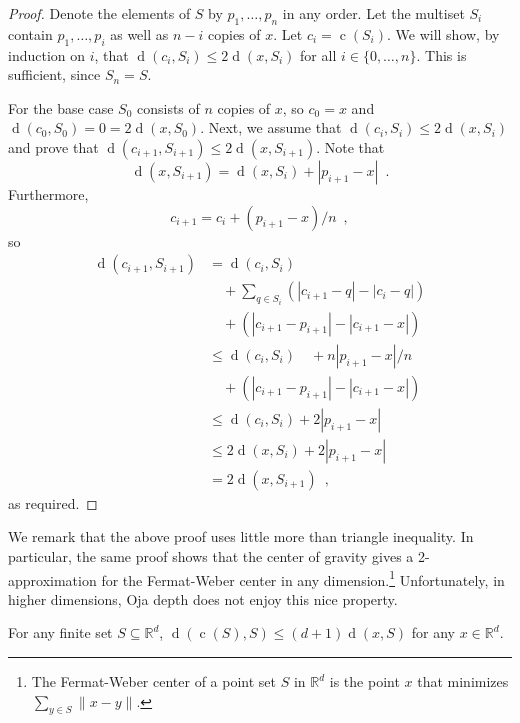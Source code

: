 \documentclass{cccg10}
\DeclareMathOperator{\od}{d}
\DeclareMathOperator{\cog}{c}
\newcommand{\R}{\mathbb{R}}
\begin{document}
\begin{proof}
Denote the elements of $S$ by $p_1,\ldots,p_n$ in any order.  Let the
multiset $S_i$ contain $p_1,\ldots,p_i$ as well as $n-i$ copies of
$x$. 
Let $c_i=\cog(S_i)$.
We will show, by induction on $i$, that $\od(c_i,S_i)\le
2\od(x,S_i)$ for all $i\in\{0,\ldots,n\}$.  This is sufficient,
since $S_n=S$.

For the base case $S_0$ consists of $n$ copies of $x$, so
$c_0=x$ and $\od(c_0,S_0)= 0 = 2\od(x,S_0)$.  Next,
we assume that $\od(c_i,S_i) \le 2\od(x,S_i)$ and prove that
$\od(c_{i+1},S_{i+1}) \le 2\od(x,S_{i+1})$.  Note that
\[
   \od(x,S_{i+1}) = \od(x,S_i) + |p_{i+1}-x| \enspace .
\]
Furthermore, 
\[
   c_{i+1} = c_i + (p_{i+1}-x)/n \enspace ,
\]
so
\begin{align*}
    \od(c_{i+1}, S_{i+1}) 
     & =  \od(c_i, S_{i}) \\ 
     &  \quad + \sum_{q\in S_i} (|c_{i+1} - q| - |c_i - q|) \\
     &    \quad + (|c_{i+1} - p_{i+1}| - |c_{i+1} - x|) \\
     & \le  \od(c_i, S_{i}) 
         \quad + n|p_{i+1}-x|/n  \\
    &    \quad + (|c_{i+1} - p_{i+1}| - |c_{i+1} - x|) \\
     & \le  \od(c_i, S_{i}) 
             + 2|p_{i+1}-x|  \\
     & \le  2\od(x, S_{i}) 
             + 2|p_{i+1}-x|  \\
     &  =  2\od(x, S_{i+1}) \enspace ,
\end{align*}
as required.
\end{proof}

We remark that the above proof uses little more than triangle
inequality. In particular, the same proof shows that the center of
gravity gives a 2-approximation for the Fermat-Weber center in any
dimension.\footnote{The Fermat-Weber center of a point set $S$ in $\R^d$
is the point $x$ that minimizes $\sum_{y\in S}\|x-y\|$.}  Unfortunately,
in higher dimensions, Oja depth does not enjoy this nice property.

\begin{theorem}
\label{thm:gravdd}
For any finite set $S\subseteq\mathbb{R}^d$,
$\od(\cog(S),S) \le (d+1)\od(x,S)$ for any $x\in\mathbb{R}^d$.
\end{theorem}
\end{document}
